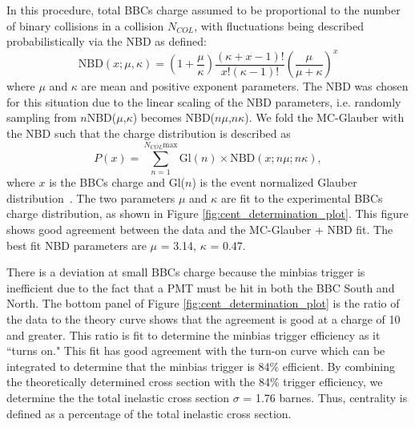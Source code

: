 In this procedure, total BBCs charge assumed to be proportional to the number of binary collisions in a \pau collision $N_{COL}$, with fluctuations being described probabilistically via the NBD as defined:
\begin{equation}
   \textrm{NBD}(x;\mu,\kappa) = \left(1+\frac{\mu}{\kappa}\right)\frac{(\kappa+x-1)!}{x!(\kappa-1)!}\left(\frac{\mu}{\mu+\kappa}\right)^x
\end{equation}
where $\mu$ and $\kappa$ are mean and positive exponent parameters. The NBD was chosen for this situation due to the linear scaling of the NBD parameters, i.e. randomly sampling from $n$NBD($\mu$,$\kappa$) becomes NBD($n\mu$,$n\kappa$). We fold the MC-Glauber with the NBD such that the charge distribution is described as
\begin{equation}
   P(x) = \sum^{N_{COL}\textrm{max}}_{n=1} \textrm{Gl}(n)\times \textrm{NBD}(x;n\mu;n\kappa),
\end{equation}
where $x$ is the BBCs charge and Gl($n$) is the event normalized Glauber distribution~\cite{PhysRevC.90.034902}. The two parameters $\mu$ and $\kappa$ are fit to the experimental BBCs charge distribution, as shown in Figure \ref{fig:cent_determination_plot}. This figure shows good agreement between the data and the MC-Glauber + NBD fit. The best fit NBD parameters are $\mu$ = 3.14, $\kappa$ = 0.47. 

There is a deviation at small BBCs charge because the minbias trigger is inefficient due to the fact that a PMT must be hit in both the BBC South and North. The bottom panel of Figure \ref{fig:cent_determination_plot} is the ratio of the data to the theory curve shows that the agreement is good at a charge of 10 and greater. This ratio is fit to determine the minbias trigger efficiency as it ``turns on." This fit has good agreement with the turn-on curve which can be integrated to determine that the minbias trigger is 84\% efficient. By combining the theoretically determined \pau cross section with the 84\% trigger efficiency, we determine the the total inelastic \pau cross section $\sigma$ = 1.76 barnes. Thus, centrality is defined as a percentage of the total inelastic cross section.

